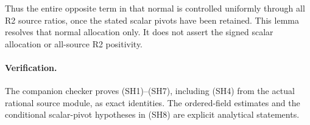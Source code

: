 Thus the entire opposite term in that normal is controlled
uniformly through all R2 source ratios, once the stated scalar
pivots have been retained.  This lemma resolves that normal
allocation only.  It does not assert the signed scalar allocation
or all-source R2 positivity.

\paragraph{Verification.}
The companion checker proves (SH1)--(SH7), including (SH4) from
the actual rational source module, as exact identities.  The
ordered-field estimates and the conditional scalar-pivot
hypotheses in (SH8) are explicit analytical statements.
